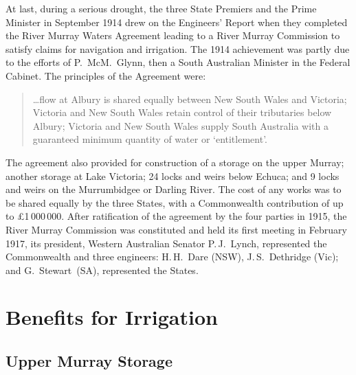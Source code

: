 At last, during a serious drought, the three State Premiers and the
Prime Minister in September 1914 drew on the Engineers' Report when
they completed the River Murray Waters Agreement leading to a River
Murray Commission  to satisfy claims
for navigation and irrigation. The 1914 achievement was partly due to
the efforts of P.~McM.~Glynn,  then a South
Australian Minister in the Federal Cabinet. The principles of the Agreement were:
\begin{quote}
	\ldots flow at Albury  is shared equally
	between New South Wales and Victoria; Victoria and New South
	Wales retain control of their tributaries below Albury;
	Victoria and New South Wales supply South Australia with a
	guaranteed minimum quantity of water or
	`entitlement'.
\end{quote}

The agreement also provided for construction of a storage on the upper
Murray; another storage at Lake Victoria;  24
locks and weirs  below Echuca;  and 9
locks and weirs on the Murrumbidgee or Darling
River.   The cost of
any works was to be shared equally by the three States, with a
Commonwealth contribution of up to \pounds1\,000\,000. After
ratification of the agreement by the four parties in 1915, the River
Murray Commission was constituted and held its first meeting in
February 1917, its president, Western Australian Senator P.\,J.~Lynch,
  represented the Commonwealth and three
engineers: H.\,H.~Dare (NSW),   J.\,S.~Dethridge
(Vic);  and G.~Stewart~(SA),   represented the States.

\section*{Benefits for Irrigation}

\subsection*{Upper Murray Storage}


